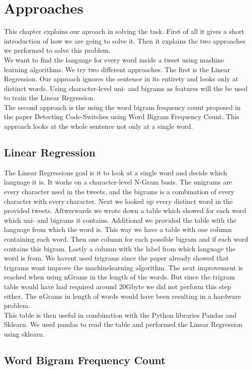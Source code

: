 \section{Approaches}\label{sec:Approaches}
This chapter explains our aproach in solving the task. First of all it gives a short introduction of how we are going to solve it. Then it explains the two approaches we performed to solve this problem. \\
We want to find the language for every word inside a tweet using mashine learning algorithms.  We try two different approaches. The first is the Linear Regression. Our approach ignores the sentence in its entirety and looks only at distinct words. Using character-level uni- and bigrams as features will the be used to train the Linear Regression.\\
The second approach is the using the word bigram frequency count proposed in the paper Detecting Code-Switches using Word Bigram Frequency Count\cite{bigramFrequencyCount}. This approach looks at the whole sentence not only at a single word. 
\subsection{Linear Regression}
The Linear Regressions goal is it to look at a single word and decide which language it is. It works on a character-level N-Gram basis. The unigrams are every character used in the tweets, and the bigrams is a combination of every character with every character. Next we looked up every distinct word in the provided tweets. Aftwerwards we wrote down a table which showed for each word which uni- and bigrams it contains. Additional we provided the table with the language from which the word is. This way we have a table with one column containing each word. Then one column for each possible bigram and if each word contains this bigram. Lastly a column with the label from which language the word is from. We havent used trigrams since the paper \cite{multipleLanguages} already showed that trigrams wont improve the machinelearning algorithm. The next improvement is reached when using nGrams in the length of the words. But since the trigram table would have had required around 20Gbyte we did not perform this step either. The nGrams in length of words would have been resulting in a hardware problem.\\
This table is then useful in combination with the Python libraries Pandas and Sklearn. We used pandas to read the table and performed the Linear Regression using sklearn.\\
\subsection{Word Bigram Frequency Count}
